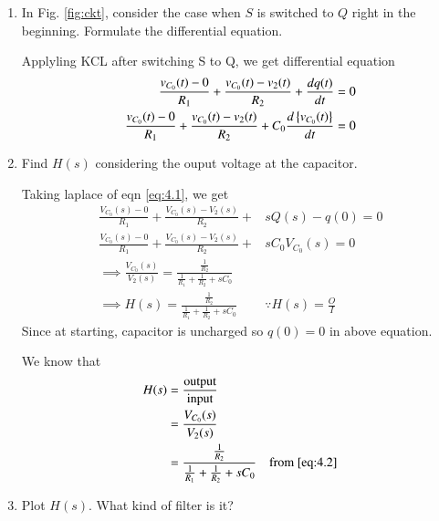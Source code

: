 \documentclass[journal,12pt,twocolumn]{IEEEtran}
\renewcommand\thesection{\arabic{section}}
\begin{document}
\begin{enumerate}[label=\arabic*.,ref=\thesection.\theenumi]
\item In Fig. 
			\ref{fig:ckt},
			consider the case when $S$ is switched to $Q$ right in the beginning. Formulate the differential equation.

			\solution 
			Applyling KCL after switching S to Q, we get differential equation
		\begin{align}
			\frac{v_{C_0}(t)-0}{R_1}+\frac{v_{C_0}(t)-v_2(t)}{R_2}+\frac{dq(t)}{dt}=0 \label{eq:4.1}\\
			\frac{v_{C_0}(t)-0}{R_1}+\frac{v_{C_0}(t)-v_2(t)}{R_2}+C_0\frac{d\left\{v_{C_0}(t)\right\}}{dt}=0 \label{eq:4.1.2}
		\end{align}
		
		\item 		Find $H(s)$ considering the ouput voltage at the capacitor.

			\solution
			Taking laplace of eqn \eqref{eq:4.1}, we get
			\begin{align}		
				\frac{V_{C_0}(s)-0}{R_1}+\frac{V_{C_0}(s)-V_2(s)}{R_2}+&sQ(s)-q(0)=0\\
				\frac{V_{C_0}(s)-0}{R_1}+\frac{V_{C_0}(s)-V_2(s)}{R_2}+&sC_0V_{C_0}(s)=0\\
				\implies \frac{V_{C_0}(s)}{V_2(s)}=\frac{\frac{1}{R_2}}{\frac{1}{R_1}+\frac{1}{R_2}+sC_0}&\label{eq:4.2}\\
				\implies H(s)=\frac{\frac{1}{R_2}}{\frac{1}{R_1}+\frac{1}{R_2}+sC_0}\quad &\because H(s)=\frac{O}{I}
			\end{align}
Since at starting, capacitor is uncharged so $q(0)=0$ in above equation.

			We know that 
			\begin{align}
				H(s)&=\frac{\text{output}}
{\text{input}}\\
				&=\frac{V_{C_0}(s)}{V_2(s)}\\
				&=\frac{\frac{1}{R_2}}{\frac{1}{R_1}+\frac{1}{R_2}+sC_0}\label{eq:4.2.1}\quad \text{from \eqref{eq:4.2}}
			\end{align}
		\item Plot $H(s)$.  What kind of filter is it?
			

\end{enumerate}
\end{document}

